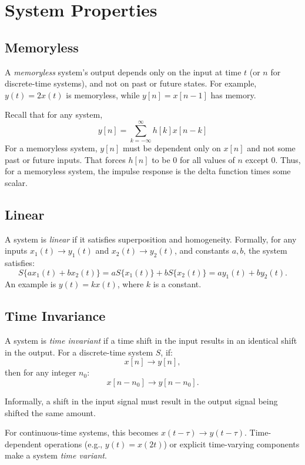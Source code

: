\section{System Properties}

\subsection{Memoryless}
A \emph{memoryless} system's output depends only on the input at time
\( t \) (or \( n \) for discrete-time systems), and not on past or
future states. For example, \( y(t) = 2x(t) \) is memoryless, while
\( y[n] = x[n-1] \) has memory.

Recall that for any system,
\begin{equation}
    y[n] = \sum_{k=-\infty}^{\infty} h[k]x[n-k]
\end{equation}
For a memoryless system, $y[n]$ must be dependent only on $x[n]$ and
not some past or future inputs. That forces $h[n]$ to be 0 for all values
of $n$ except 0. Thus, for a memoryless system, the impulse response
is the delta function times some scalar.

\subsection{Linear}
A system is \emph{linear} if it satisfies superposition and homogeneity. Formally, for any inputs \( x_1(t) \rightarrow y_1(t) \) and \( x_2(t) \rightarrow y_2(t) \), and constants \( a, b \), the system satisfies:
\[
    S\{a x_1(t) + b x_2(t)\} = a S\{x_1(t)\} + b S\{x_2(t)\} = a y_1(t) + b y_2(t).
\]
An example is \( y(t) = kx(t) \), where \( k \) is a constant.

\subsection{Time Invariance}
A system is \emph{time invariant} if a time shift in the input results in an identical shift in the output. For a discrete-time system \( S \), if:
\[
    x[n] \rightarrow y[n],
\]
then for any integer \( n_0 \):
\[
    x[n - n_0] \rightarrow y[n - n_0].
\]

Informally, a shift in the input signal must result in the output signal
being shifted the same amount.

For continuous-time systems, this becomes \( x(t - \tau) \rightarrow y(t - \tau) \). Time-dependent operations (e.g., \( y(t) = x(2t) \)) or explicit time-varying components make a system \emph{time variant}.

